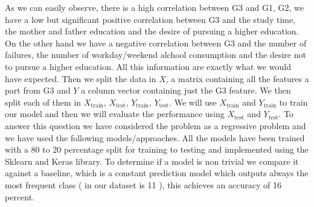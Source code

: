 \documentclass[a4paper, 11pt]{report}
\theoremstyle{definition}
\numberwithin{equation}{section}		%
\numberwithin{table}{section}				%
\begin{document}
As we can easily observe, there is a high correlation between G3 and G1, G2, we have a low but significant positive correlation between G3 and the study time, the mother and father education and the desire of pursuing a higher education. On the other hand we have a negative correlation between G3 and the number of failures, the number of workday/weekend alchool consumption and the desire not to pursue a higher education. All this information are exactly what we would have expected. Then we split the data in $X$, a matrix containing all the features a part from G3 and $Y$ a column vector containing just the G3 feature. We then split each of them in $X_{\text{train}}$, $X_{\text{test}}$, $Y_{\text{train}}$, $Y_{\text{test}}$. We will use $X_{\text{train}}$ and $Y_{\text{train}}$ to train our model and then we will evaluate the performance using $X_{\text{test}}$ and $Y_{\text{test}}$. To answer this question we have considered the problem as a regressive problem and we have used the following models/approaches. All the models have been trained with a 80 to 20 percentage split for training to testing and implemented using the Sklearn and Keras library. To determine if a model is non trivial we compare it against a baseline, which is a constant prediction model which outputs always the most frequent class ( in our dataset is 11 ), this achieves an accuracy of 16 percent.
\end{document}
